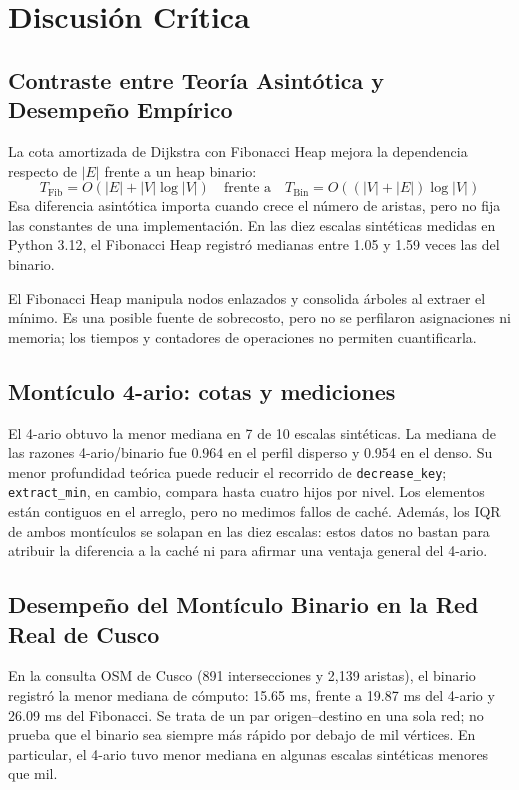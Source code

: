 \section{Discusión Crítica}
\label{sec:discusion}

\subsection{Contraste entre Teoría Asintótica y Desempeño Empírico}
La cota amortizada de Dijkstra con Fibonacci Heap mejora la dependencia respecto de $|E|$ frente a un heap binario:
\begin{equation}
    T_{\text{Fib}} = O(|E| + |V| \log |V|) \quad \text{frente a} \quad T_{\text{Bin}} = O((|V| + |E|) \log |V|)
    \label{eq:asintotica_comparativa}
\end{equation}
Esa diferencia asintótica importa cuando crece el número de aristas, pero no fija las constantes de una implementación. En las diez escalas sintéticas medidas en Python 3.12, el Fibonacci Heap registró medianas entre 1.05 y 1.59 veces las del binario.

El Fibonacci Heap manipula nodos enlazados y consolida árboles al extraer el mínimo. Es una posible fuente de sobrecosto, pero no se perfilaron asignaciones ni memoria; los tiempos y contadores de operaciones no permiten cuantificarla.

\subsection{Montículo 4-ario: cotas y mediciones}
El 4-ario obtuvo la menor mediana en 7 de 10 escalas sintéticas. La mediana de las razones 4-ario/binario fue 0.964 en el perfil disperso y 0.954 en el denso. Su menor profundidad teórica puede reducir el recorrido de \texttt{decrease\_key}; \texttt{extract\_min}, en cambio, compara hasta cuatro hijos por nivel. Los elementos están contiguos en el arreglo, pero no medimos fallos de caché. Además, los IQR de ambos montículos se solapan en las diez escalas: estos datos no bastan para atribuir la diferencia a la caché ni para afirmar una ventaja general del 4-ario.

\subsection{Desempeño del Montículo Binario en la Red Real de Cusco}
En la consulta OSM de Cusco (891 intersecciones y 2,139 aristas), el binario registró la menor mediana de cómputo: 15.65 ms, frente a 19.87 ms del 4-ario y 26.09 ms del Fibonacci. Se trata de un par origen--destino en una sola red; no prueba que el binario sea siempre más rápido por debajo de mil vértices. En particular, el 4-ario tuvo menor mediana en algunas escalas sintéticas menores que mil.

